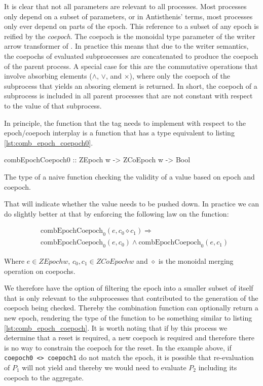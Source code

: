 It is clear that not all parameters are relevant to all processes.
Most processes only depend on a subset of parameters, or in
Antisthenis' terms, most processes only ever depend on parts of the
epoch. This reference to a subset of any epoch is reified by the
\emph{coepoch}. The coepoch is the monoidal type parameter of the writer
arrow transformer of .  In practice this means that due
to the writer semantics, the coepochs of evaluated subproecesses are
concatenated to produce the coepoch of the parent process. A special
case for this are the commutative operations that involve absorbing
elements (\(\land\), \(\lor\), and \(\times\)), where only the coepoch
of the subprocess that yields an absoring element is returned. In
short, the coepoch of a subprocess is included in all parent processes
that are not constant with respect to the value of that subprocess.

In principle, the function that the  tag needs to
implement with respect to the epoch/coepoch interplay is a function
that has a type equivalent to listing \ref{lst:comb_epoch_coepoch0}.

\begin{code}
\begin{haskellcode}
combEpochCoepoch0 :: ZEpoch w -> ZCoEpoch w -> Bool
\end{haskellcode}
  \caption{\label{lst:comb_epoch_coepoch0}The type of a naive function
    checking the validity of a value based on epoch and coepoch.}
\end{code}

That will indicate whether the value needs to be pushed down. In
practice we can do slightly better at that by enforcing the following
law on the  function:

\begin{align*}
& \text{combEpochCoepoch}_0(e, c_0 \diamond c_1) \Rightarrow \\
& \text{combEpochCoepoch}_0(e,c_0) \land \text{combEpochCoepoch}_0(e,c_1)
\end{align*}

Where \(e \in \mathit{ZEpoch w}\), \(c_0,c_1 \in \mathit{ZCoEpoch w}\)
and \(\diamond\) is the monoidal merging operation on coepochs.

We therefore have the option of filtering the epoch into a smaller
subset of itself that is only relevant to the subprocesses that
contributed to the generation of the coepoch being checked. Thereby
the combination function can optionally return a new epoch, rendering
the type of the function to be something similar to listing
\ref{lst:comb_epoch_coepoch}. It is worth noting that if by this
process we determine that a reset is required, a new coepoch is
required and therefore there is no way to constrain the coepoch for
the reset. In the example above, if \texttt{coepoch0 <> coepoch1} do
not match the epoch, it is possible that re-evaluation of \(P_1\) will
not yield  and thereby we would need to evaluate
\(P_2\) including its coepoch to the aggregate.

